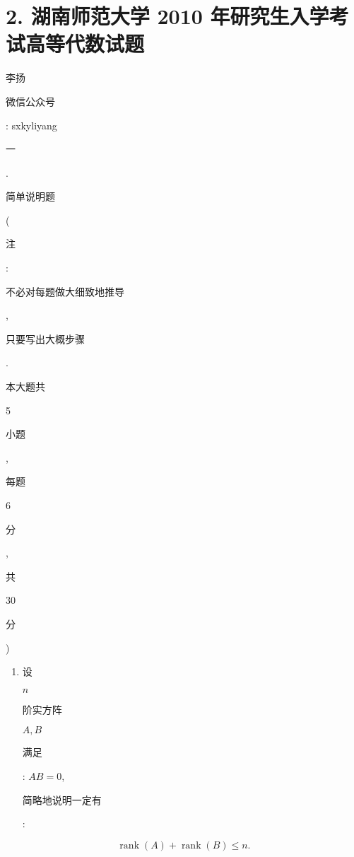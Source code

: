 \documentclass[10pt]{article}
\begin{document}
\section{2. 湖南师范大学 2010 年研究生入学考试高等代数试题}
\begin{CJK}{UTF8}{mj}李扬\end{CJK}

\begin{CJK}{UTF8}{mj}微信公众号\end{CJK}: sxkyliyang

\begin{CJK}{UTF8}{mj}一\end{CJK}. \begin{CJK}{UTF8}{mj}简单说明题\end{CJK} (\begin{CJK}{UTF8}{mj}注\end{CJK}: \begin{CJK}{UTF8}{mj}不必对每题做大细致地推导\end{CJK}, \begin{CJK}{UTF8}{mj}只要写出大概步骤\end{CJK}. \begin{CJK}{UTF8}{mj}本大题共\end{CJK} 5 \begin{CJK}{UTF8}{mj}小题\end{CJK}, \begin{CJK}{UTF8}{mj}每题\end{CJK} 6 \begin{CJK}{UTF8}{mj}分\end{CJK}, \begin{CJK}{UTF8}{mj}共\end{CJK} 30 \begin{CJK}{UTF8}{mj}分\end{CJK})

\begin{enumerate}
  \item \begin{CJK}{UTF8}{mj}设\end{CJK} $n$ \begin{CJK}{UTF8}{mj}阶实方阵\end{CJK} $A, B$ \begin{CJK}{UTF8}{mj}满足\end{CJK}: $A B=0$, \begin{CJK}{UTF8}{mj}简略地说明一定有\end{CJK}:
\end{enumerate}
$$
\operatorname{rank}(A)+\operatorname{rank}(B) \leqslant n .
$$
\end{document}
